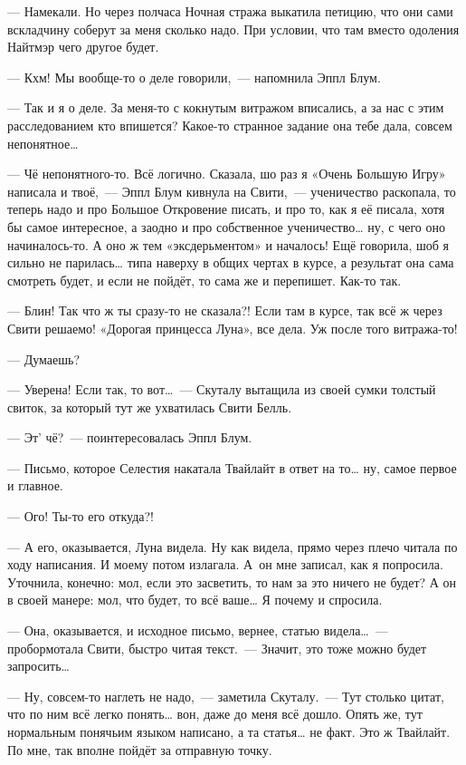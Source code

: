 \documentclass[fontsize=11pt,a5paper,titlepage=firstcover]{scrbook}
\begin{document}
--- Намекали. Но через полчаса Ночная стража выкатила петицию, что они сами вскладчину соберут за меня сколько надо. При условии, что там вместо одоления Найтмэр чего другое будет.

--- Кхм! Мы вообще-то о деле говорили,~--- напомнила Эппл Блум.

--- Так и я о деле. За меня-то с кокнутым витражом вписались, а за нас с этим расследованием кто впишется? Какое-то странное задание она тебе дала, совсем непонятное{\ldots}

--- Чё непонятного-то. Всё логично. Сказала, шо раз я «Очень Большую Игру» написала и твоё,~--- Эппл Блум кивнула на Свити,~--- ученичество раскопала, то теперь надо и про Большое Откровение писать, и про то, как я её писала, хотя бы самое интересное, а заодно и про собственное ученичество{\ldots} ну, с чего оно начиналось-то. А оно ж тем «эксдерьментом» и началось! Ещё говорила, шоб я сильно не парилась{\ldots} типа наверху в общих чертах в курсе, а результат она сама смотреть будет, и если не пойдёт, то сама же и перепишет. Как-то так.

--- Блин! Так что ж ты сразу-то не сказала?! Если там в курсе, так всё ж через Свити решаемо! «Дорогая принцесса Луна», все дела. Уж после того витража-то!

--- Думаешь?

--- Уверена! Если так, то вот{\ldots}~--- Скуталу вытащила из своей сумки толстый свиток, за который тут же ухватилась Свити Белль.

--- Эт’ чё?~--- поинтересовалась Эппл Блум.

--- Письмо, которое Селестия накатала Твайлайт в ответ на то{\ldots} ну, самое первое и главное.

--- Ого! Ты-то его откуда?!

--- А его, оказывается, Луна видела. Ну как видела, прямо через плечо читала по ходу написания. И моему потом излагала. А~он мне записал, как я попросила. Уточнила, конечно: мол, если это засветить, то нам за это ничего не будет? А он в своей манере: мол, что будет, то всё ваше{\ldots} Я почему и спросила.

--- Она, оказывается, и исходное письмо, вернее, статью видела{\ldots}~--- пробормотала Свити, быстро читая текст.~--- Значит, это тоже можно будет запросить{\ldots}

--- Ну, совсем-то наглеть не надо,~--- заметила Скуталу.~--- Тут столько цитат, что по ним всё легко понять{\ldots} вон, даже до меня всё дошло. Опять же, тут нормальным понячьим языком написано, а та статья{\ldots} не факт. Это ж Твайлайт. По мне, так вполне пойдёт за отправную точку.
\end{document}
